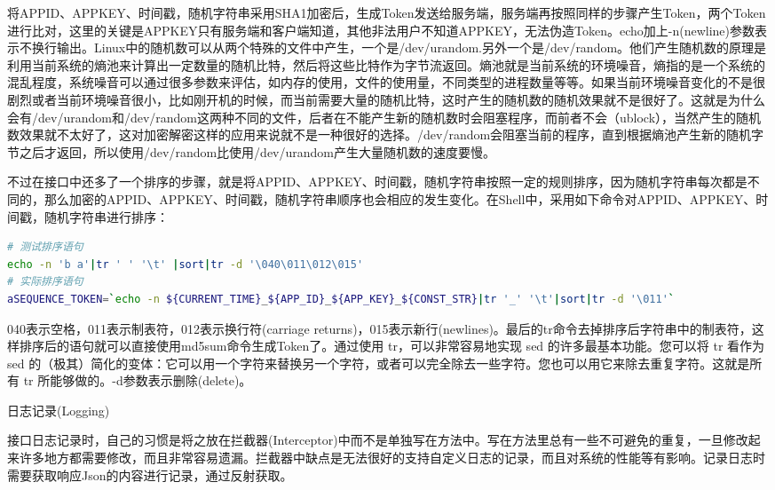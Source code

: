 \documentclass[12pt]{book}
\makeatletter
\numberwithin{dummy}{section}
\theoremstyle{ocrenumbox}
\theoremstyle{blacknumex}
\theoremstyle{blacknumbox}
\theoremstyle{ocrenum}
\renewcommand{\subsection}{\@startsection {subsection}{2}{\z@}
	{-3ex \@plus -0.1ex \@minus -.4ex}
	{0.5ex \@plus.2ex }
	{\normalfont\sffamily\bfseries}}
\makeatother
\begin{document}
将APPID、APPKEY、时间戳，随机字符串采用SHA1加密后，生成Token发送给服务端，服务端再按照同样的步骤产生Token，两个Token进行比对，这里的关键是APPKEY只有服务端和客户端知道，其他非法用户不知道APPKEY，无法伪造Token。echo加上-n(newline)参数表示不换行输出。Linux中的随机数可以从两个特殊的文件中产生，一个是/dev/urandom.另外一个是/dev/random。他们产生随机数的原理是利用当前系统的熵池来计算出一定数量的随机比特，然后将这些比特作为字节流返回。熵池就是当前系统的环境噪音，熵指的是一个系统的混乱程度，系统噪音可以通过很多参数来评估，如内存的使用，文件的使用量，不同类型的进程数量等等。如果当前环境噪音变化的不是很剧烈或者当前环境噪音很小，比如刚开机的时候，而当前需要大量的随机比特，这时产生的随机数的随机效果就不是很好了。这就是为什么会有/dev/urandom和/dev/random这两种不同的文件，后者在不能产生新的随机数时会阻塞程序，而前者不会（ublock），当然产生的随机数效果就不太好了，这对加密解密这样的应用来说就不是一种很好的选择。/dev/random会阻塞当前的程序，直到根据熵池产生新的随机字节之后才返回，所以使用/dev/random比使用/dev/urandom产生大量随机数的速度要慢。


不过在接口中还多了一个排序的步骤，就是将APPID、APPKEY、时间戳，随机字符串按照一定的规则排序，因为随机字符串每次都是不同的，那么加密的APPID、APPKEY、时间戳，随机字符串顺序也会相应的发生变化。在Shell中，采用如下命令对APPID、APPKEY、时间戳，随机字符串进行排序：

\begin{lstlisting}[language=Bash]
# 测试排序语句
echo -n 'b a'|tr ' ' '\t' |sort|tr -d '\040\011\012\015'
# 实际排序语句
aSEQUENCE_TOKEN=`echo -n ${CURRENT_TIME}_${APP_ID}_${APP_KEY}_${CONST_STR}|tr '_' '\t'|sort|tr -d '\011'`
\end{lstlisting}

040表示空格，011表示制表符，012表示换行符(carriage returns)，015表示新行(newlines)。最后的tr命令去掉排序后字符串中的制表符，这样排序后的语句就可以直接使用md5sum命令生成Token了。通过使用 tr，可以非常容易地实现 sed 的许多最基本功能。您可以将 tr 看作为 sed 的（极其）简化的变体：它可以用一个字符来替换另一个字符，或者可以完全除去一些字符。您也可以用它来除去重复字符。这就是所有 tr 所能够做的。-d参数表示删除(delete)。

\subsection{日志记录(Logging)}

接口日志记录时，自己的习惯是将之放在拦截器(Interceptor)中而不是单独写在方法中。写在方法里总有一些不可避免的重复，一旦修改起来许多地方都需要修改，而且非常容易遗漏。拦截器中缺点是无法很好的支持自定义日志的记录，而且对系统的性能等有影响。记录日志时需要获取响应Json的内容进行记录，通过反射获取。
\end{document}
